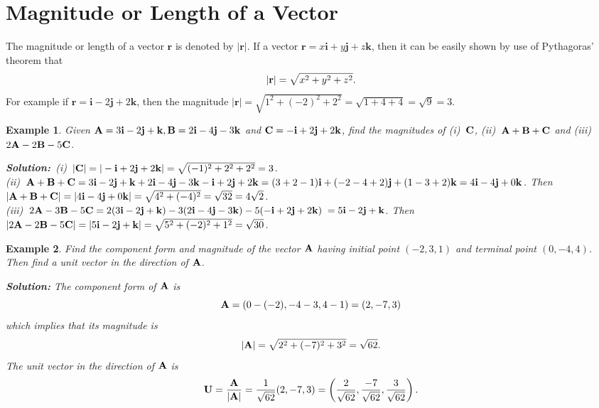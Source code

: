 \documentclass[titlepage,a4paper,12pt]{report}
\newtheorem{example}{Example}[section]
\begin{document}
\section{Magnitude or Length of a Vector}
The magnitude or length of a vector $\textbf{r}$ is denoted by $|\textbf{r}|$. If a vector $\textbf{r}=x\textbf{i}+y\textbf{j}+z\textbf{k}$, then it can be easily shown by use of Pythagoras' theorem that
\[|{\bf{r}}|=\sqrt{x^2+y^2+z^2}.\] For example if $\textbf{r}=\textbf{i}-2\textbf{j}+2\textbf{k}$, then the magnitude $|\textbf{r}|=\sqrt{1^2+(-2)^2+2^2}=\sqrt{1+4+4}=\sqrt{9}=3$. 
\begin{example}
Given ${\bf{A}}=3{\bf{i}}-2{\bf{j}}+{\bf{k}}, {\bf{B}}=2{\bf{i}}-4{\bf{j}}-3{\bf{k}}$ and ${\bf{C}}=-{\bf{i}}+2{\bf{j}}+2{\bf{k}}$, find the magnitudes of (i)\, ${\bf{C}}$, \quad (ii)\, ${\bf{A}}+{\bf{B}}+{\bf{C}}$ and (iii)\, $2{\bf{A}}-2{\bf{B}}-5{\bf{C}}$.

\noindent \textbf{Solution:}\,  (i)\, $|{\bf{C}}|=|-{\bf{i}}+2{\bf{j}}+2{\bf{k}}|=\sqrt{(-1)^2+2^2+2^2}=3$.\\
(ii)\, ${\bf{A}}+{\bf{B}}+{\bf{C}}=3{\bf{i}}-2{\bf{j}}+{\bf{k}} +2{\bf{i}}-4{\bf{j}}-3{\bf{k}}-{\bf{i}}+2{\bf{j}}+2{\bf{k}} =(3+2-1){\bf{i}}+(-2-4+2){\bf{j}}+(1-3+2){\bf{k}}=4{\bf{i}}-4{\bf{j}}+0{\bf{k}}$. Then $|{\bf{A}}+{\bf{B}}+{\bf{C}}|=|4{\bf{i}}-4{\bf{j}}+0{\bf{k}}|=\sqrt{4^2+(-4)^2}=\sqrt{32}=4\sqrt{2}$.\\
(iii)\, $2{\bf{A}}-3{\bf{B}}-5{\bf{C}}=2(3{\bf{i}}-2{\bf{j}}+{\bf{k}})-3(2{\bf{i}}-4{\bf{j}}-3{\bf{k}})-5(-{\bf{i}}+2{\bf{j}}+2{\bf{k}})$
$=5{\bf{i}}-2{\bf{j}}+{\bf{k}}$. Then $|2{\bf{A}}-2{\bf{B}}-5{\bf{C}}| =|5{\bf{i}}-2{\bf{j}}+{\bf{k}}|=\sqrt{5^2+(-2)^2+1^2}=\sqrt{30}$.
\end{example}
\begin{example}
Find the component form and magnitude of the vector ${\bf{A}}$ having initial point $(-2,3,1)$ and terminal point $(0,-4,4)$. Then find a unit vector in the direction of ${\bf{A}}$.

\noindent \textbf{Solution:} The component form of ${\bf{A}}$ is 
\[{\bf{A}}=(0-(-2), -4-3, 4-1)=(2,-7,3)\] which implies that its magnitude is 
\[|{\bf{A}}|=\sqrt{2^2+(-7)^2+3^2}=\sqrt{62}.\] The unit vector in the direction of ${\bf{A}}$ is 
\[{\bf{U}}=\dfrac{{\bf{A}}}{|{\bf{A}}|}=\dfrac{1}{\sqrt{62}}(2,-7,3)=\left(\dfrac{2}{\sqrt{62}}, \dfrac{-7}{\sqrt{62}}, \dfrac{3}{\sqrt{62}}\right).\]
\end{example}
\end{document}

